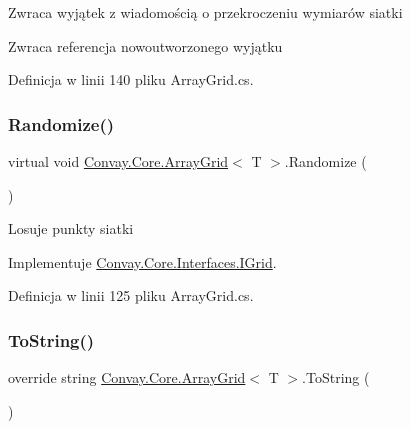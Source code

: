 Zwraca wyjątek z wiadomością o przekroczeniu wymiarów siatki 

\begin{DoxyReturn}{Zwraca}
referencja nowoutworzonego wyjątku
\end{DoxyReturn}


Definicja w linii 140 pliku Array\+Grid.\+cs.

\hypertarget{class_convay_1_1_core_1_1_array_grid_a0a40a1e8519368ecfcb1e1467a53e513}{}\label{class_convay_1_1_core_1_1_array_grid_a0a40a1e8519368ecfcb1e1467a53e513} 
\subsubsection{\texorpdfstring{Randomize()}{Randomize()}}
{\footnotesize\ttfamily virtual void \hyperlink{class_convay_1_1_core_1_1_array_grid}{Convay.\+Core.\+Array\+Grid}$<$ T $>$.Randomize (\begin{DoxyParamCaption}{ }\end{DoxyParamCaption})\hspace{0.3cm}{\ttfamily [virtual]}}



Losuje punkty siatki 



Implementuje \hyperlink{interface_convay_1_1_core_1_1_interfaces_1_1_i_grid_aee7beb6eae4302772adf85ecfc26b756}{Convay.\+Core.\+Interfaces.\+I\+Grid}.



Definicja w linii 125 pliku Array\+Grid.\+cs.

\hypertarget{class_convay_1_1_core_1_1_array_grid_a8f64f748e08f32c2bf04ac1ec97f3e82}{}\label{class_convay_1_1_core_1_1_array_grid_a8f64f748e08f32c2bf04ac1ec97f3e82} 
\subsubsection{\texorpdfstring{To\+String()}{ToString()}}
{\footnotesize\ttfamily override string \hyperlink{class_convay_1_1_core_1_1_array_grid}{Convay.\+Core.\+Array\+Grid}$<$ T $>$.To\+String (\begin{DoxyParamCaption}{ }\end{DoxyParamCaption})}



